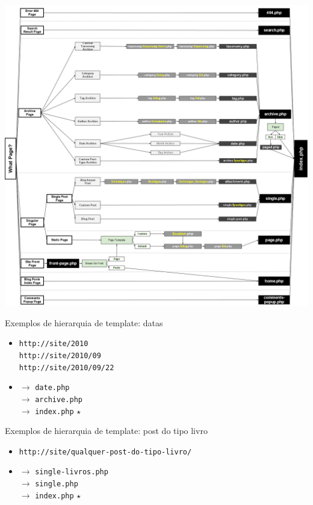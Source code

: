 \documentclass[handout]{beamer}
\begin{document}
\begin{frame}
\begin{center}
  \includegraphics[height=0.9\textheight]{./img/template-hierarchy.png}
\end{center}
\end{frame}

\begin{frame}{Exemplos de hierarquia de template: datas}
\begin{itemize}
  \pause \item \texttt{http://site/2010} \\
    \pause \texttt{http://site/2010/09} \\
    \pause \texttt{http://site/2010/09/22}
  \pause \item $\rightarrow$ \texttt{date.php} \\
    \pause $\rightarrow$ \texttt{archive.php} \\
    \pause $\rightarrow$ \texttt{index.php} $\star$
\end{itemize}
\end{frame}

\begin{frame}{Exemplos de hierarquia de template: post do tipo livro}
\begin{itemize}
  \pause \item \texttt{http://site/qualquer-post-do-tipo-livro/}
  \pause \item $\rightarrow$ \texttt{single-livros.php} \\
    \pause $\rightarrow$ \texttt{single.php} \\
    \pause $\rightarrow$ \texttt{index.php} $\star$
\end{itemize}
\end{frame}
\end{document}
